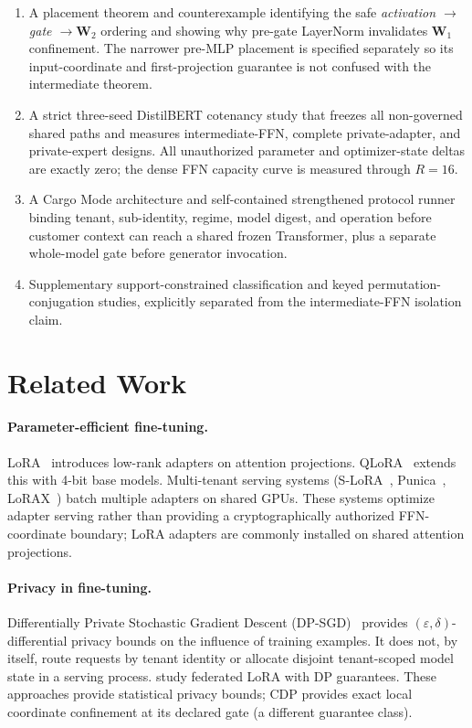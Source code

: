 \documentclass[11pt,a4paper]{article}
\newcommand{\bW}{\mathbf{W}}
\begin{document}
\begin{enumerate}[nosep]
    \item A placement theorem and counterexample identifying the safe
    \emph{activation $\to$ gate $\to\bW_2$} ordering and showing why
    pre-gate LayerNorm invalidates $\bW_1$ confinement.  The narrower
    pre-MLP placement is specified separately so its input-coordinate
    and first-projection guarantee is not confused with the
    intermediate theorem.
    \item A strict three-seed DistilBERT cotenancy study that freezes
    all non-governed shared paths and measures intermediate-FFN,
    complete private-adapter, and private-expert designs.  All
    unauthorized parameter and optimizer-state deltas are exactly
    zero; the dense FFN capacity curve is measured through $R{=}16$.
    \item A Cargo Mode architecture and self-contained strengthened
    protocol runner binding tenant, sub-identity, regime, model digest,
    and operation before customer context can reach a shared frozen
    Transformer, plus a separate whole-model gate before generator
    invocation.
    \item Supplementary support-constrained classification and keyed
    permutation-conjugation studies, explicitly separated from the
    intermediate-FFN isolation claim.
\end{enumerate}

\section{Related Work}
\label{sec:related}

\paragraph{Parameter-efficient fine-tuning.}
LoRA~\citep{hu2022lora} introduces low-rank adapters on attention
projections.  QLoRA~\citep{dettmers2024qlora} extends this with
4-bit base models.  Multi-tenant serving systems
(S-LoRA~\citep{sheng2024slora}, Punica~\citep{chen2023punica},
LoRAX~\citep{predibase2024lorax}) batch multiple adapters
on shared GPUs.  These systems optimize adapter serving rather than
providing a cryptographically authorized FFN-coordinate boundary;
LoRA adapters are commonly installed on shared attention
projections.

\paragraph{Privacy in fine-tuning.}
Differentially Private Stochastic Gradient Descent (DP-SGD)~\citep{abadi2016deep} provides $(\varepsilon,\delta)$-differential
privacy bounds on the influence of training examples.  It does not,
by itself, route requests by tenant identity or allocate disjoint
tenant-scoped model state in a serving process.
\citet{wang2023dpfederated} study federated LoRA with DP
guarantees.  These approaches provide statistical privacy
bounds; CDP provides exact local coordinate confinement at its
declared gate (a different guarantee class).
\end{document}
